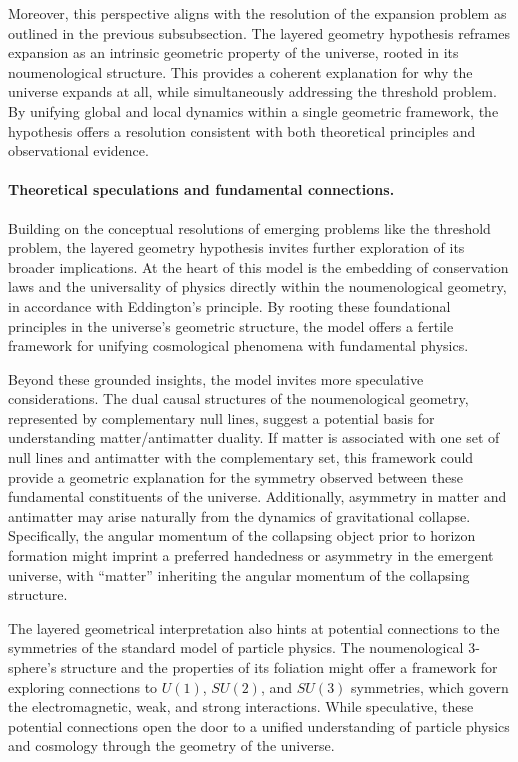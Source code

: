 \documentclass[aps,rmp,groupedaddress,twocolumn,10pt]{revtex4-2}
\begin{document}
Moreover, this perspective aligns with the resolution of the expansion problem as outlined in the previous subsubsection. The layered geometry hypothesis reframes expansion as an intrinsic geometric property of the universe, rooted in its noumenological structure. This provides a coherent explanation for why the universe expands at all, while simultaneously addressing the threshold problem. By unifying global and local dynamics within a single geometric framework, the hypothesis offers a resolution consistent with both theoretical principles and observational evidence.

\paragraph{Theoretical speculations and fundamental connections.} 
Building on the conceptual resolutions of emerging problems like the threshold problem, the layered geometry hypothesis invites further exploration of its broader implications. At the heart of this model is the embedding of conservation laws and the universality of physics directly within the noumenological geometry, in accordance with Eddington's principle. By rooting these foundational principles in the universe's geometric structure, the model offers a fertile framework for unifying cosmological phenomena with fundamental physics.

Beyond these grounded insights, the model invites more speculative considerations. The dual causal structures of the noumenological geometry, represented by complementary null lines, suggest a potential basis for understanding matter/antimatter duality. If matter is associated with one set of null lines and antimatter with the complementary set, this framework could provide a geometric explanation for the symmetry observed between these fundamental constituents of the universe. Additionally, asymmetry in matter and antimatter may arise naturally from the dynamics of gravitational collapse. Specifically, the angular momentum of the collapsing object prior to horizon formation might imprint a preferred handedness or asymmetry in the emergent universe, with ``matter'' inheriting the angular momentum of the collapsing structure.

The layered geometrical interpretation also hints at potential connections to the symmetries of the standard model of particle physics. The noumenological 3-sphere's structure and the properties of its foliation might offer a framework for exploring connections to $U(1)$, $SU(2)$, and $SU(3)$ symmetries, which govern the electromagnetic, weak, and strong interactions. While speculative, these potential connections open the door to a unified understanding of particle physics and cosmology through the geometry of the universe.
\end{document}
